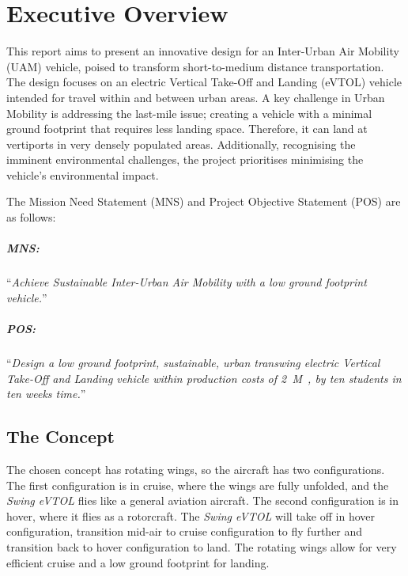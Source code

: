 \chapter{Executive Overview}
\label{ch:Executive_Overview}
This report aims to present an innovative design for an Inter-Urban Air Mobility (UAM) vehicle, poised to transform short-to-medium distance transportation.
The design focuses on an electric Vertical Take-Off and Landing (eVTOL) vehicle intended for travel within and between urban areas.
A key challenge in Urban Mobility is addressing the last-mile issue; creating a vehicle with a minimal ground footprint that requires less landing space. Therefore, it can land at vertiports in very densely populated areas.
Additionally, recognising the imminent environmental challenges, the project prioritises minimising the vehicle's environmental impact.

The Mission Need Statement (MNS) and Project Objective Statement (POS) are as follows:

\paragraph{MNS:}“\textit{Achieve Sustainable Inter-Urban Air Mobility with a low ground footprint vehicle.}”
\vspace{-5mm}
\paragraph{POS:}“\textit{Design a low ground footprint, sustainable, urban transwing electric Vertical Take-Off and Landing vehicle within production costs of \qty{2}{M\texteuro}, by ten students in ten weeks time.}”


\section*{The Concept}
The chosen concept has rotating wings, so the aircraft has two configurations. The first configuration is in cruise, where the wings are fully unfolded, and the \textit{Swing eVTOL} flies like a general aviation aircraft. The second configuration is in hover, where it flies as a rotorcraft. The \textit{Swing eVTOL} will take off in hover configuration, transition mid-air to cruise configuration to fly further and transition back to hover configuration to land. The rotating wings allow for very efficient cruise and a low ground footprint for landing.


